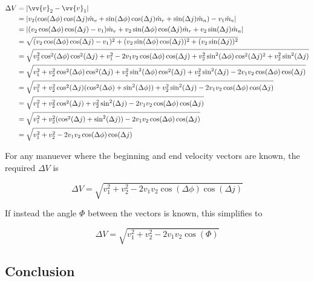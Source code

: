 \documentclass[../basicOrbitalDynamics.tex]{subfiles}
\begin{document}
\begin{align*}
    \Delta V &= |\vv{v}_2-\vv{v}_1| \\
    &= |v_2(\cos(\Delta \phi)\cos(\Delta j)\hat{m}_v+\sin(\Delta \phi)\cos(\Delta j)\hat{m}_r+\sin(\Delta j)\hat{m}_n)-v_1\hat{m}_v| \\
    &= |(v_2\cos(\Delta \phi)\cos(\Delta j)-v_1)\hat{m}_v+v_2\sin(\Delta \phi)\cos(\Delta j)\hat{m}_r+v_2\sin(\Delta j)\hat{m}_n| \\
    &= \sqrt{(v_2\cos(\Delta \phi)\cos(\Delta j)-v_1)^2+(v_2\sin(\Delta \phi)\cos(\Delta j))^2+(v_2\sin(\Delta j))^2} \\
    &= \sqrt{v_2^2\cos^2(\Delta \phi)\cos^2(\Delta j)+v_1^2-2v_1v_2\cos(\Delta \phi)\cos(\Delta j)+v_2^2\sin^2(\Delta \phi)\cos^2(\Delta j)^2+v_2^2\sin^2(\Delta j)} \\
    &= \sqrt{v_1^2+v_2^2\cos^2(\Delta \phi)\cos^2(\Delta j)+v_2^2\sin^2(\Delta \phi)\cos^2(\Delta j)+v_2^2\sin^2(\Delta j)-2v_1v_2\cos(\Delta \phi)\cos(\Delta j)} \\
    &= \sqrt{v_1^2+v_2^2\cos^2(\Delta j)(\cos^2(\Delta \phi)+\sin^2(\Delta \phi))+v_2^2\sin^2(\Delta j)-2v_1v_2\cos(\Delta \phi)\cos(\Delta j)} \\
    &= \sqrt{v_1^2+v_2^2\cos^2(\Delta j)+v_2^2\sin^2(\Delta j)-2v_1v_2\cos(\Delta \phi)\cos(\Delta j)} \\
    &= \sqrt{v_1^2+v_2^2(\cos^2(\Delta j)+\sin^2(\Delta j))-2v_1v_2\cos(\Delta \phi)\cos(\Delta j)} \\
    &= \sqrt{v_1^2+v_2^2-2v_1v_2\cos(\Delta \phi)\cos(\Delta j)} \\
\end{align*}

For any manuever where the beginning and end velocity vectors are known, the required $\Delta V$ is

\begin{equation}
    \Delta V = \sqrt{v_1^2+v_2^2-2v_1v_2\cos(\Delta \phi)\cos(\Delta j)}
\end{equation}

If instead the angle $\varPhi$ between the vectors is known, this simplifies to

\begin{equation}
    \Delta V = \sqrt{v_1^2+v_2^2-2v_1v_2\cos(\varPhi)}
\end{equation}

\bigskip\bigskip
\subsection{Conclusion}
\end{document}
